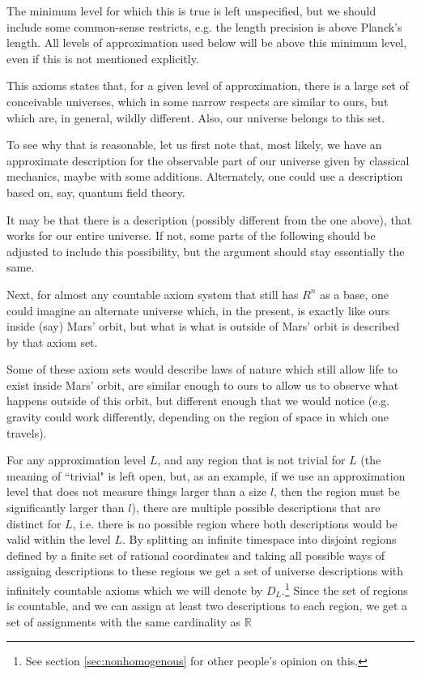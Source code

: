 \documentclass[a4paper
,draft
]{article}
\def\reale{\mathbb{R}}
\def\descriptions{D_L}
\newcommand{\ghilimele}[1]{``#1"}
\begin{document}
The minimum level for which this is true is left unspecified, but we should
include some common-sense restricts, e.g. the length precision is above
Planck's length. All levels of approximation used below will be above this
minimum level, even if this is not mentioned explicitly.

This axioms states that, for a given level of approximation,
there is a large set of conceivable universes, which in some narrow respects
are similar to ours, but which are, in general, wildly different.
Also, our universe belongs to this set.

To see why that is reasonable, let us first note that,
most likely, we have an approximate description for the observable part
of our universe
given by classical mechanics, maybe with some additions.
Alternately, one could use a description based on, say, quantum field theory.

It may be that there is a description (possibly different from the one above),
that works for our entire universe.
If not, some parts of the following should
be adjusted to include this possibility, but the argument should stay
essentially the same.

Next, for almost any countable axiom system that still
has $R^n$ as a base, one could imagine an alternate universe
which, in the present, is exactly like ours inside (say) Mars' orbit,
but what is what is outside of Mars' orbit is described by that axiom set.

Some of these axiom sets would describe laws of nature which still allow life
to exist inside Mars' orbit, are similar enough
to ours to allow us to observe what happens outside of this orbit,
but different enough that
we would notice (e.g. gravity could work differently, depending on the region
of space in which one travels).

For any approximation level $L$, and any region that is not trivial
for $L$
(the meaning of \ghilimele{trivial} is left open, but, as an example,
if we use an approximation level that does not measure things larger
than a size $l$, then the region must be significantly larger than $l$),
there are multiple possible descriptions that
are distinct for $L$, i.e. there is no possible region where both descriptions
would be valid within the level $L$.
By splitting an infinite timespace
into disjoint regions defined by a finite set of rational coordinates
and taking all possible ways of assigning descriptions to these regions
we get a set of universe descriptions with infinitely countable axioms
which we will denote by $\descriptions$.\footnote{See
section \ref{sec:nonhomogenous} for other people's opinion on this.}
Since the set of regions is countable, and we can assign at least two
descriptions to each region, we get a set of assignments with the same
cardinality as $\reale$
\end{document}
